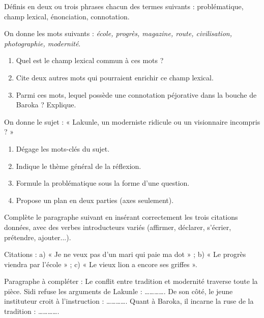 \documentclass[11pt]{article}
\newcommand{\cle}[1]{{\popxbold\color{popdark}#1}}
\newcounter{popsec}
\newcounter{popsub}
\newcommand{\courssub}[1]{%
  \stepcounter{popsub}%
  \par\vspace{9pt}\noindent{\popxbold\fontsize{11.5}{13}\selectfont\color{popink}{\color{poporange}\thepopsec.\thepopsub}\hspace{6pt}#1}\par\nopagebreak\vspace{4pt}
}
\begin{document}
\begin{exercice}[Définitions]
Définis en deux ou trois phrases chacun des termes suivants : \cle{problématique}, \cle{champ lexical}, \cle{énonciation}, \cle{connotation}.
\end{exercice}

\begin{exercice}
On donne les mots suivants : \emph{école, progrès, magazine, route, civilisation, photographie, modernité}.
\begin{enumerate}
\item Quel est le champ lexical commun à ces mots ?
\item Cite deux autres mots qui pourraient enrichir ce champ lexical.
\item Parmi ces mots, lequel possède une connotation péjorative dans la bouche de Baroka ? Explique.
\end{enumerate}
\end{exercice}

\courssub{Je m'entraîne}

\begin{exercice}
On donne le sujet : « Lakunle, un moderniste ridicule ou un visionnaire incompris ? »
\begin{enumerate}
\item Dégage les mots-clés du sujet.
\item Indique le thème général de la réflexion.
\item Formule la problématique sous la forme d'une question.
\item Propose un plan en deux parties (axes seulement).
\end{enumerate}
\end{exercice}

\begin{exercice}
Complète le paragraphe suivant en insérant correctement les trois citations données, avec des verbes introducteurs variés (affirmer, déclarer, s'écrier, prétendre, ajouter...).

Citations : a) « Je ne veux pas d'un mari qui paie ma dot » ; b) « Le progrès viendra par l'école » ; c) « Le vieux lion a encore ses griffes ».

Paragraphe à compléter : Le conflit entre tradition et modernité traverse toute la pièce. Sidi refuse les arguments de Lakunle : \ldots\ldots\ldots\ldots. De son côté, le jeune instituteur croit à l'instruction : \ldots\ldots\ldots\ldots. Quant à Baroka, il incarne la ruse de la tradition : \ldots\ldots\ldots\ldots.
\end{exercice}
\end{document}
